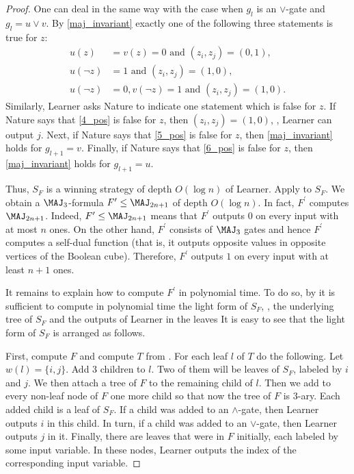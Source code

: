 \begin{proof}
One can deal in the same way with the case when $g_l$ is an $\lor$-gate and $g_l = u \lor v$. By \eqref{maj_invariant} exactly one of the following three statements is true for $z$:
\begin{align}
\label{4_pos}
u(z) &=   v(z) = 0 \mbox{ and } (z_i, z_j) = (0,1), \\
\label{5_pos}
u(\lnot z) &= 1 \mbox{ and } (z_i,z_j) = (1,0),\\
\label{6_pos}
u(\lnot z) &= 0,  v(\lnot z) = 1 \mbox{ and } (z_i,z_j) = (1,0).
\end{align}
Similarly, Learner asks Nature to indicate one statement which is false for $z$. If Nature says that \eqref{4_pos} is false for $z$, then $(z_i,z_j) = (1,0)$, \ie, Learner can output $j$. Next, if Nature says that \eqref{5_pos} is false for $z$, then   \eqref{maj_invariant} holds for $g_{l + 1} = v$. Finally, if Nature says that \eqref{6_pos} is false for $z$, then \eqref{maj_invariant} holds for $g_{l + 1} = u$.

Thus, $S_F$ is 
%
a winning strategy of depth $O(\log n)$  %
of Learner. Apply  to $S_F$. 
%
We obtain  %
%
%
a $\MAJ_3$-formula $F^\prime \le \MAJ_{2n + 1}$
of depth $O(\log n)$.  %
In fact, $F^\prime$ computes $\MAJ_{2n + 1}$. Indeed, $F^\prime \le \MAJ_{2n + 1}$ means that $F^\prime$ outputs $0$ on every input with at most $n$ ones. On the other hand, $F^\prime$ consists of $\MAJ_3$ gates and hence $F^\prime$ computes a self-dual function (that is, it outputs opposite values in opposite vertices of the Boolean cube). Therefore, $F^\prime$ outputs $1$ on every input with at least $n + 1$ ones.

It remains to explain how to  compute $F^\prime$ in polynomial time. To do so, by  it is sufficient to compute in polynomial time the light form of $S_F$, \ie, the underlying tree of $S_F$ and  the outputs of Learner in the %
leaves  %
%
It is easy to see that the light form of $S_F$ is arranged as follows.

First, compute $F$ and compute $T$ from . For each leaf $l$ of $T$ do the following. Let $w(l) = \{i, j\}$. Add $3$ children to $l$. Two of them will be leaves of $S_F$, labeled by $i$ and $j$. We then attach a tree of $F$ to the remaining child of $l$.   Then we add to every non-leaf node of $F$ one more child so that now the tree of $F$ is $3$-ary. Each added child is a leaf of $S_F$. If a child was added to an $\land$-gate, then Learner outputs $i$ in this child. In turn, if a child was added to an $\lor$-gate, then Learner outputs $j$ in it. Finally, there are leaves that were in $F$ initially, each labeled by some input variable. In these nodes, Learner outputs the index of the corresponding input variable.
\end{proof}

